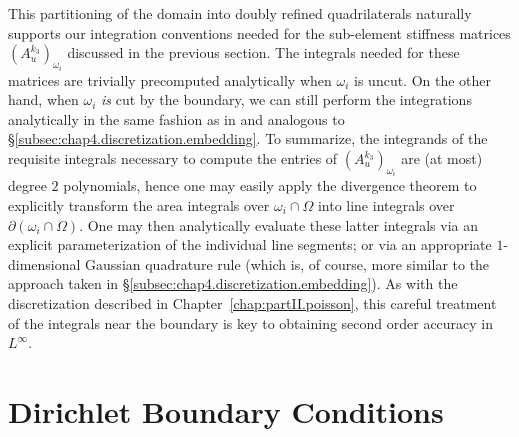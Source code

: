 This partitioning of the domain into doubly refined quadrilaterals naturally supports our integration conventions needed for the sub-element stiffness matrices $(A_u^{k_3})_{\omega_i}$ discussed in the previous section. The integrals needed for these matrices are trivially precomputed analytically when $\omega_i$ is uncut. On the other hand, when $\omega_i$ \emph{is} cut by the boundary, we can still perform the integrations analytically in the same fashion as in \cite{Bedrossian10} and analogous to \S\ref{subsec:chap4.discretization.embedding}. To summarize, the integrands of the requisite integrals necessary to compute the entries of $(A_u^{k_3})_{\omega_i}$ are (at most) degree $2$ polynomials, hence one may easily apply the divergence theorem to explicitly transform the area integrals over $\omega_i \cap \Omega$ into line integrals over $\partial(\omega_i \cap \Omega)$. One may then analytically evaluate these latter integrals via an explicit parameterization of the individual line segments; or via an appropriate $1$-dimensional Gaussian quadrature rule (which is, of course, more similar to the approach taken in \S\ref{subsec:chap4.discretization.embedding}). As with the discretization described in Chapter~\ref{chap:partII.poisson}, this careful treatment of the integrals near the boundary is key to obtaining second order accuracy in $L^\infty$.

\section{Dirichlet Boundary Conditions} \label{sec:chap5.dirichlet}

